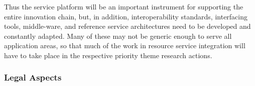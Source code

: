 \documentclass[10pt, plain]{../../metanetpaper}
\begin{document}
\begin{multicols}{2}
Thus the service platform will be an important instrument for supporting the entire innovation chain, but, in addition, interoperability standards, interfacing tools, middle-ware, and reference service architectures need to be developed and constantly adapted. Many of these may not be generic enough to serve all application areas, so that much of the work in resource service integration will have to take place in the respective priority theme research actions.

\subsubsection{Legal Aspects}
\label{sec:legal-aspects}

%

\end{multicols}
\end{document}
